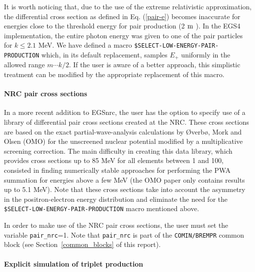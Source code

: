 It is worth noticing that, due to the use of the extreme
relativistic approximation,  the differential cross
section as defined in Eq. (\ref{pair-e}) becomes inaccurate
for energies close to the threshold energy for pair production
(2 $\rm m$ ).
In the EGS4 implementation, the entire photon energy
was given to one of the pair particles for $k \le 2.1$ MeV.
We have defined a macro {\tt \$SELECT-LOW-ENERGY-PAIR-PRODUCTION}
which, in its default replacement, samples $E_+$ uniformly
in the allowed range $m \cdots k/2$. If the user is aware
of a better approach, this simplistic treatment can be
modified by the appropriate replacement of this macro.

\paragraph{NRC pair cross sections}\hfill
{}

In a more recent addition to EGSnrc, the user has the option
to specify use of a library of differential pair cross sections created
at the NRC. These cross sections are based on the exact partial-wave-analysis
calculations by {\O}verb{\o}, Mork and Olsen (OMO) \cite{Ov73} for the
unscreened nuclear potential modified by a multiplicative screening correction.
The main difficulty in creating this data library, which provides cross
sections up to 85 MeV for all elements between 1 and 100, consisted in finding
numerically stable approaches for performing the PWA summation for energies
above a few MeV (the OMO paper \cite{Ov73} only contains results up to 5.1 MeV).
Note that these cross sections take into account the asymmetry in the
positron-electron energy distribution and eliminate the need
for the {\tt \$SELECT-LOW-ENERGY-PAIR-PRODUCTION} macro mentioned
above.

In order to make use of the NRC pair cross sections, the user
must set the variable {\tt pair\_nrc}=1.  Note that
{\tt pair\_nrc} is part of the {\tt COMIN/BREMPR} common block
(see Section~\ref{common_blocks} of this report).

\paragraph{Explicit simulation of triplet production}\hfill
{}

